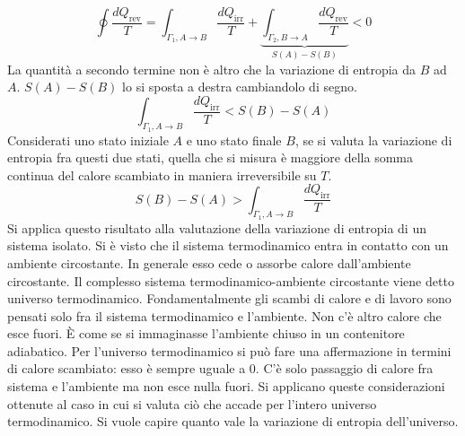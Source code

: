 \documentclass[10pt,a4paper]{book}
\begin{document}
\begin{figure}[htpb]
\end{figure}
\FloatBarrier
\[
	\oint \frac{dQ_{\text{rev} } }{T} = \int_{\Gamma_1,A\to B } \frac{dQ_{\text{irr} } }{T} + \underbrace{\int_{\Gamma_2,B\to A} \frac{dQ_{\text{rev} } }{T}}_{S(A)-S(B)} < 0
\]
La quantità a secondo termine non è altro che la variazione di entropia da $B$ ad $A$. $S(A)-S(B)$ lo si sposta a destra cambiandolo di segno.
\[
	\int_{\Gamma_1,A\to B } \frac{dQ_{\text{irr} } }{T} < S(B)-S(A)
\]
Considerati uno stato iniziale $A$ e uno stato finale $B$, se si valuta la variazione di entropia fra questi due stati, quella che si misura è maggiore della somma continua del calore scambiato in maniera irreversibile su $T$.
\[
	S(B)-S(A) > \int_{\Gamma_1,A\to B } \frac{dQ_{\text{irr} } }{T}
\]
Si applica questo risultato alla valutazione della variazione di entropia di un sistema isolato. Si è visto che il sistema termodinamico entra in contatto con un ambiente circostante. In generale esso cede o assorbe calore dall'ambiente circostante. Il complesso sistema termodinamico-ambiente circostante viene detto universo termodinamico. Fondamentalmente gli scambi di calore e di lavoro sono pensati solo fra il sistema termodinamico e l'ambiente. Non c'è altro calore che esce fuori. È come se si immaginasse l'ambiente chiuso in un contenitore adiabatico. Per l'universo termodinamico si può fare una affermazione in termini di calore scambiato: esso è sempre uguale a $0$. C'è solo passaggio di calore fra sistema e l'ambiente ma non esce nulla fuori. Si applicano queste considerazioni ottenute al caso in cui si valuta ciò che accade per l'intero universo termodinamico. Si vuole capire quanto vale la variazione di entropia dell'universo.
\end{document}
